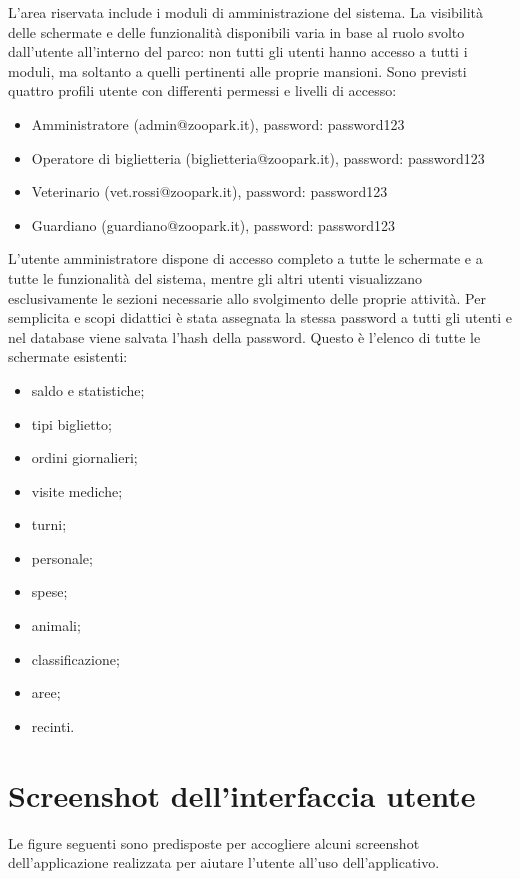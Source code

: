 \documentclass[12pt,a4paper]{report}
\begin{document}
L’area riservata include i moduli di amministrazione del sistema. La visibilità delle schermate e delle funzionalità disponibili varia in base al ruolo svolto dall’utente all’interno del parco: non tutti gli utenti hanno accesso a tutti i moduli, ma soltanto a quelli pertinenti alle proprie mansioni. Sono previsti quattro profili utente con differenti permessi e livelli di accesso: 
\begin{itemize}
    \renewcommand{\labelitemi}{-}
    \item Amministratore (admin@zoopark.it), password: password123
    \item Operatore di biglietteria (biglietteria@zoopark.it), password: password123
    \item Veterinario (vet.rossi@zoopark.it), password: password123
    \item Guardiano (guardiano@zoopark.it), password: password123
\end{itemize}
L’utente amministratore dispone di accesso completo a tutte le schermate e a tutte le funzionalità del sistema, mentre gli altri utenti visualizzano esclusivamente le sezioni necessarie allo svolgimento delle proprie attività. Per semplicita e scopi didattici è stata assegnata la stessa password a tutti gli utenti e nel database viene salvata l'hash della password.
\newline
Questo è l'elenco di tutte le schermate esistenti:
\begin{itemize}[itemsep=2pt]
    \item saldo e statistiche;
    \item tipi biglietto;
    \item ordini giornalieri;
    \item visite mediche;
    \item turni;
    \item personale;
    \item spese;
    \item animali;
    \item classificazione;
    \item aree;
    \item recinti.
\end{itemize}

\section{Screenshot dell'interfaccia utente}

Le figure seguenti sono predisposte per accogliere alcuni screenshot dell'applicazione
realizzata per aiutare l'utente all'uso dell'applicativo. 
\end{document}
